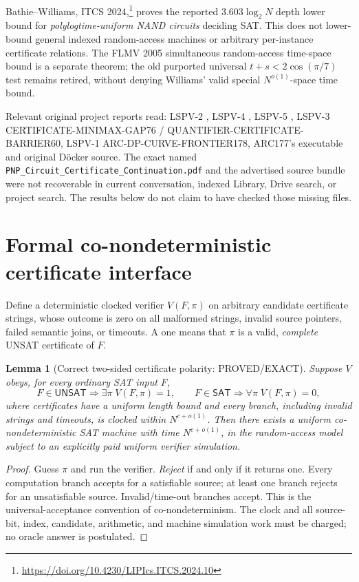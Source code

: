 \documentclass[11pt]{article}
\newtheorem{lemma}[theorem]{Lemma}
\newcommand{\SAT}{\mathsf{SAT}}
\newcommand{\UNSAT}{\mathsf{UNSAT}}
\begin{document}
Bathie--Williams, ITCS 2024,\footnote{\url{https://doi.org/10.4230/LIPIcs.ITCS.2024.10}}
proves the reported $3.603\log_2N$ depth lower bound for
\emph{polylogtime-uniform NAND circuits} deciding SAT. This does not
lower-bound general indexed random-access machines or arbitrary
per-instance certificate relations. The FLMV 2005 simultaneous
random-access time-space bound is a separate theorem; the old purported
universal $t+s<2\cos(\pi/7)$ test remains retired, without denying
Williams' valid special $N^{o(1)}$-space time bound.

Relevant original project reports read: LSPV-2
, LSPV-4
, LSPV-5
,
LSPV-3 CERTIFICATE-MINIMAX-GAP76 / QUANTIFIER-CERTIFICATE-BARRIER60,
LSPV-1 ARC-DP-CURVE-FRONTIER178, ARC177's executable and original D\"ocker
source. The exact named \texttt{PNP\_Circuit\_Certificate\_Continuation.pdf}
and the advertised source bundle were not recoverable in current
conversation, indexed Library, Drive search, or project search.
The results below do not claim to have checked those missing files.

\section{Formal co-nondeterministic certificate interface}
Define a deterministic clocked verifier $V(F,\pi)$ on arbitrary candidate
certificate strings, whose outcome is zero on all malformed strings,
invalid source pointers, failed semantic joins, or timeouts. A one means
that $\pi$ is a valid, \emph{complete} UNSAT certificate of $F$.

\begin{lemma}[Correct two-sided certificate polarity: PROVED/EXACT]
Suppose $V$ obeys, for every ordinary SAT input $F$,
\[
 F\in\UNSAT\Longrightarrow\exists\pi\; V(F,\pi)=1,
 \qquad F\in\SAT\Longrightarrow\forall\pi\;V(F,\pi)=0,
\]
where certificates have a uniform length bound and every branch, including
invalid strings and timeouts, is clocked within $N^{c+o(1)}$.
Then there exists a uniform co-nondeterministic SAT machine with time
$N^{c+o(1)}$, in the random-access model subject to an explicitly paid
uniform verifier simulation.
\end{lemma}
\begin{proof}
Guess $\pi$ and run the verifier. \emph{Reject} if and only if it returns
one. Every computation branch accepts for a satisfiable source; at least
one branch rejects for an unsatisfiable source. Invalid/time-out branches
accept. This is the universal-acceptance convention of co-nondeterminism.
The clock and all source-bit, index, candidate, arithmetic, and machine
simulation work must be charged; no oracle answer is postulated.
\end{proof}
\end{document}
